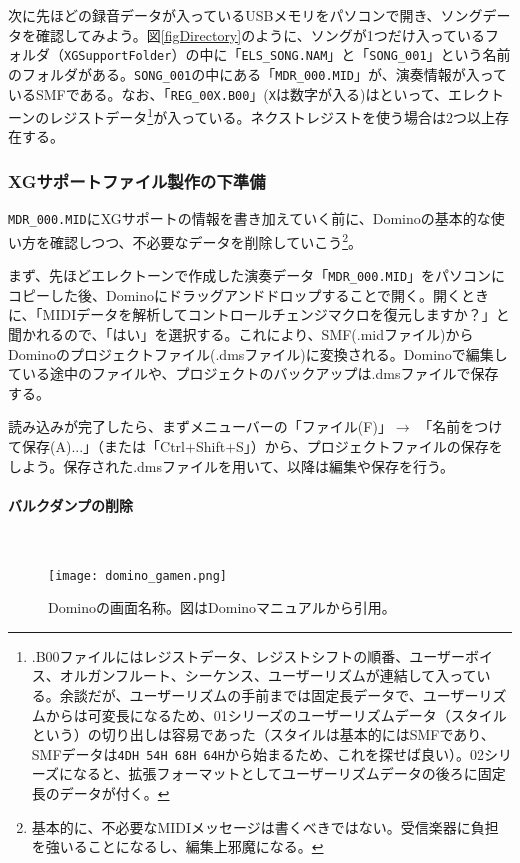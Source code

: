 \documentclass[uplatex, 10pt, dvipdfmx]{jsarticle}
\numberwithin{equation}{section}
\newcommand{\emphj}[1]{\textbf{\textrm{\textgt{{#1}}}}}
\begin{document}
次に先ほどの録音データが入っているUSBメモリをパソコンで開き、ソングデータを確認してみよう。図\ref{figDirectory}のように、ソングが1つだけ入っているフォルダ（\texttt{XGSupportFolder}）の中に「\texttt{ELS_SONG.NAM}」と「\texttt{SONG_001}」という名前のフォルダがある。\texttt{SONG_001}の中にある「\texttt{MDR_000.MID}」が、演奏情報が入っているSMFである。なお、「\texttt{REG_00X.B00}」(\texttt{X}は数字が入る)は\emphj{バルクファイル}といって、エレクトーンのレジストデータ\footnote{.B00ファイルにはレジストデータ、レジストシフトの順番、ユーザーボイス、オルガンフルート、シーケンス、ユーザーリズムが連結して入っている\cite{B00}。余談だが、ユーザーリズムの手前までは固定長データで、ユーザーリズムからは可変長になるため、01シリーズのユーザーリズムデータ（スタイルという）の切り出しは容易であった（スタイルは基本的にはSMFであり、SMFデータは\texttt{4DH 54H 68H 64H}から始まるため、これを探せば良い）。02シリーズになると、拡張フォーマットとしてユーザーリズムデータの後ろに固定長のデータが付く。}が入っている。ネクストレジストを使う場合は2つ以上存在する。

\subsubsection{XGサポートファイル製作の下準備}
\texttt{MDR_000.MID}にXGサポートの情報を書き加えていく前に、Dominoの基本的な使い方を確認しつつ、不必要なデータを削除していこう\footnote{基本的に、不必要なMIDIメッセージは書くべきではない。受信楽器に負担を強いることになるし、編集上邪魔になる。}。

まず、先ほどエレクトーンで作成した演奏データ「\texttt{MDR_000.MID}」をパソコンにコピーした後、Dominoにドラッグアンドドロップすることで開く。開くときに、「MIDIデータを解析してコントロールチェンジマクロを復元しますか？」と聞かれるので、「はい」を選択する。これにより、SMF(.midファイル)からDominoのプロジェクトファイル(.dmsファイル)に変換される。Dominoで編集している途中のファイルや、プロジェクトのバックアップは.dmsファイルで保存する。

読み込みが完了したら、まずメニューバーの「ファイル(F)」$\rightarrow$ 「名前をつけて保存(A)...」（または「Ctrl$+$Shift$+$S」）から、プロジェクトファイルの保存をしよう。保存された.dmsファイルを用いて、以降は編集や保存を行う。

\paragraph{バルクダンプの削除} \ 

\begin{figure}[h]
  \centering
  \texttt{[image: domino\_gamen.png]}
  \caption{Dominoの画面名称。図はDominoマニュアルから引用。}
  \label{figdominogamen}
\end{figure}
\end{document}
